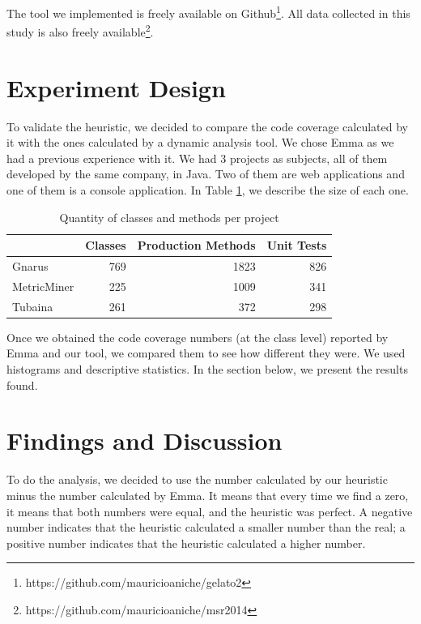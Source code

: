 \documentclass{sig-alternate}
\begin{document}
The tool we implemented is freely available on Github\footnote{https://github.com/mauricioaniche/gelato2}. 
All data collected in this study is also freely available\footnote{https://github.com/mauricioaniche/msr2014}.

\section{Experiment Design}
\label{sec-experiment}

To validate the heuristic, we decided to compare the code coverage calculated by it with the ones 
calculated by a dynamic analysis tool. We chose Emma as we had a previous experience with it. We
had 3 projects as subjects, all of them developed by the same company, in Java. Two of them are
web applications and one of them is a console application. In Table \ref{tab:projects}, we describe
the size of each one.

\begin{table}[h!]
\centering
\caption{Quantity of classes and methods per project}
\begin{tabular}{ | l | r | r | r | }
\hline
& Classes & Production Methods & Unit Tests\\ 
\hline
Gnarus & 769 & 1823 & 826\\ 
MetricMiner & 225 & 1009 & 341\\ 
Tubaina & 261 & 372 & 298\\ 

\hline
\end{tabular}
\label{tab:projects}
\end{table}

Once we obtained the code coverage numbers (at the class level) reported by Emma and our tool, 
we compared them to see how different
they were. We used histograms and descriptive statistics. In the section below, we present the results found.

\section{Findings and Discussion}
\label{sec-results}

To do the analysis, we decided to use the number calculated by our heuristic minus the
number calculated by Emma. It means that every time we find a zero, it means that both numbers
were equal, and the heuristic was perfect. A negative number indicates that the heuristic calculated
a smaller number than the real; a positive number indicates that the heuristic calculated a higher
number.
\end{document}
